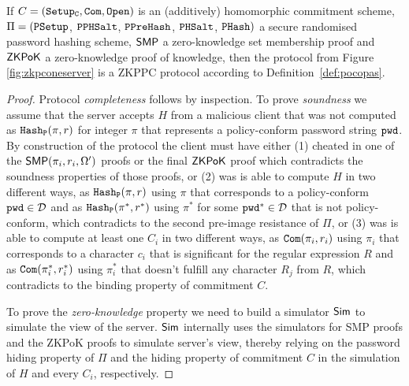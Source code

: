\begin{theorem}\label{theo:singlegen}
If $C=(\mathtt{Setup_C},\mathtt{Com},\mathtt{Open})$ is an (additively) homomorphic commitment scheme, $\Pi=(\mathtt{PSetup}$, $\mathtt{PPHSalt}$, $\mathtt{PPreHash}$, $\mathtt{PHSalt}$, $\mathtt{PHash})$ a secure randomised password hashing scheme, $\mathsf{SMP}$ a zero-knowledge set membership proof and $\mathsf{ZKPoK}$ a zero-knowledge proof of knowledge, then the protocol from Figure \ref{fig:zkpconeserver} is a \ac{ZKPPC} protocol according to Definition~\ref{def:pocopas}.
\end{theorem}

\begin{proof}
Protocol \emph{completeness} follows by inspection.
To prove \emph{soundness} we assume that the server accepts $H$ from a malicious client that was not computed as $\mathtt{Hash_P}(\pi,r)$ for integer $\pi$ that represents a policy-conform password string $\mathtt{pwd}$. 
By construction of the protocol the client must have either (1) cheated in one of the $\mathsf{SMP}(\pi_i,r_i,\Omega')$ proofs or the final $\mathsf{ZKPoK}$ proof which contradicts the soundness properties of those proofs, or (2) was is able to compute $H$ in two different ways, as $\mathtt{Hash_P}(\pi,r)$ using $\pi$ that corresponds to a policy-conform $\mathtt{pwd}\in\mathcal{D}$ and as $\mathtt{Hash_P}(\pi^\ast,r^\ast)$ using $\pi^\ast$ for some $\mathtt{pwd}^\ast\in\mathcal{D}$ that is not policy-conform, which contradicts to the second pre-image resistance of $\Pi$, or (3) was is able to compute at least one $C_i$ in two different ways, as $\mathtt{Com}(\pi_i, r_i)$ using $\pi_i$  that corresponds to a character $c_i$ that is significant for the regular expression $R$ and as $\mathtt{Com}(\pi^\ast_i, r^\ast_i)$ using $\pi^\ast_i$ that doesn't fulfill any character $R_j$ from $R$, which contradicts to the binding property of commitment $C$.

To prove the \emph{zero-knowledge} property we need to build a simulator $\mathsf{Sim}$ to simulate the view of the server. 
$\mathsf{Sim}$ internally uses the simulators for SMP proofs and the ZKPoK proofs to simulate server's view, thereby relying on the password hiding property of $\Pi$ and the hiding property of commitment $C$ in the simulation of $H$ and every $C_i$, respectively.
\end{proof}

